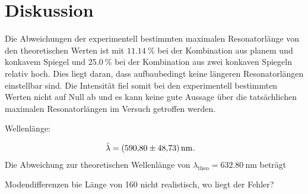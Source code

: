 \section{Diskussion}
\label{sec:Diskussion}

Die Abweichungen der experimentell bestimmten maximalen Resonatorlänge von den theoretischen Werten ist mit $\qty{11.14}{\percent}$ bei der Kombination
aus planem und konkavem Spiegel und $\qty{25.0}{\percent}$ bei der Kombination aus zwei konkaven Spiegeln relativ hoch.
Dies liegt daran, dass aufbaubedingt keine längeren Resonatorlängen einstellbar sind. Die Intensität fiel somit bei den experimentell bestimmten
Werten nicht auf Null ab und es kann keine gute Aussage über die tatsächlichen maximalen Resonatorlängen im Versuch getroffen werden.



Wellenlänge:

\begin{align*}
    \bar{\lambda} &= \qty{590.80 \pm 48.73}{\nano\meter}.
\end{align*}
Die Abweichung zur theoretischen Wellenlänge von $\lambda_{\text{theo}}= \qty{632.80}{\nano\meter}$ beträgt



Modendifferenzen bie Länge von 160 nicht realistisch, wo liegt der Fehler?